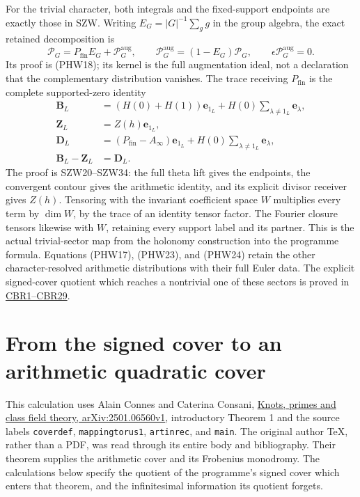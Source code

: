 \documentclass[
  10pt,
  a4paper,
]{article}
\begin{document}
For the trivial character, both integrals and the fixed-support
endpoints are exactly those in SZW. Writing \(E_G=|G|^{-1}\sum_g g\) in
the group algebra, the exact retained decomposition is \[
\mathscr P_G=P_{\mathrm{fin}}E_G+\mathscr P_G^{\mathrm{aug}},\qquad
\mathscr P_G^{\mathrm{aug}}=(1-E_G)\mathscr P_G,\qquad
\epsilon\mathscr P_G^{\mathrm{aug}}=0.
\tag{PHW24}
\] Its proof is (PHW18); its kernel is the full augmentation ideal, not
a declaration that the complementary distribution vanishes. The trace
receiving \(P_{\mathrm{fin}}\) is the complete supported-zero identity
\[
\begin{aligned}
\boldsymbol B_L&=(H(0)+H(1))\mathbf e_{1_L}
+H(0)\sum_{\lambda\ne1_L}\mathbf e_\lambda,\\
\boldsymbol Z_L&=Z(h)\mathbf e_{1_L},\\
\boldsymbol D_L&=(P_{\mathrm{fin}}-A_\infty)\mathbf e_{1_L}
+H(0)\sum_{\lambda\ne1_L}\mathbf e_\lambda,\\
\boldsymbol B_L-\boldsymbol Z_L&=\boldsymbol D_L.
\end{aligned}
\tag{PHW25}
\] The proof is SZW20--SZW34: the full theta lift gives the endpoints,
the convergent contour gives the arithmetic identity, and its explicit
divisor receiver gives \(Z(h)\). Tensoring with the invariant
coefficient space \(W\) multiplies every term by \(\dim W\), by the
trace of an identity tensor factor. The Fourier closure tensors likewise
with \(W\), retaining every support label and its partner. This is the
actual trivial-sector map from the holonomy construction into the
programme formula. Equations (PHW17), (PHW23), and (PHW24) retain the
other character-resolved arithmetic distributions with their full Euler
data. The explicit signed-cover quotient which reaches a nontrivial one
of these sectors is proved in
\href{https://github.com/KokunoYumeto/zeta-function-research-reader/blob/4a4238afc992e77aee83b97d38a1a63d283f540c/workbenches/splitzero-tandem/branches/tau-zero-prime-positivity/CLASS_FIELD_SIGNED_HOLONOMY_DERIVATION.md}{CBR1--CBR29}.

\clearpage

\section{From the signed cover to an arithmetic quadratic
cover}\label{from-the-signed-cover-to-an-arithmetic-quadratic-cover}

This calculation uses Alain Connes and Caterina Consani,
\href{https://arxiv.org/abs/2501.06560v1}{Knots, primes and class field
theory, arXiv:2501.06560v1}, introductory Theorem 1 and the source
labels \texttt{coverdef}, \texttt{mappingtorus1}, \texttt{artinrec}, and
\texttt{main}. The original author TeX, rather than a PDF, was read
through its entire body and bibliography. Their theorem supplies the
arithmetic cover and its Frobenius monodromy. The calculations below
specify the quotient of the programme's signed cover which enters that
theorem, and the infinitesimal information its quotient forgets.
\end{document}
